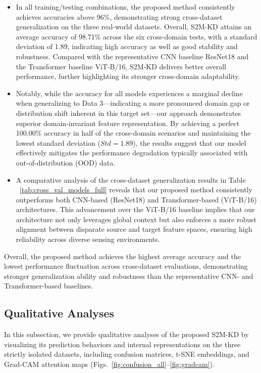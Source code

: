 \documentclass[review]{elsarticle}
\begin{document}
\begin{itemize}
\item In all training/testing combinations, the proposed method consistently achieves accuracies above 96\%, demonstrating strong cross-dataset generalization on the three real-world datasets. Overall, S2M-KD attains an average accuracy of 98.71\% across the six cross-domain tests, with a standard deviation of 1.89, indicating high accuracy as well as good stability and robustness. Compared with the representative CNN baseline ResNet18 and the Transformer baseline ViT-B/16, S2M-KD delivers better overall performance, further highlighting its stronger cross-domain adaptability.

 \item Notably, while the accuracy for all models experiences a marginal decline when generalizing to Data 3—indicating a more pronounced domain gap or distribution shift inherent in this target set—our approach demonstrates superior domain-invariant feature representation. By achieving a perfect 100.00\% accuracy in half of the cross-domain scenarios and maintaining the lowest standard deviation ($Std= 1.89$), the results suggest that our model effectively mitigates the performance degradation typically associated with out-of-distribution (OOD) data.
 \item A comparative analysis of the cross-dataset generalization results in Table ~\ref{tab:cross_val_models_full} reveals that our proposed method consistently outperforms both CNN-based (ResNet18) and Transformer-based (ViT-B/16) architectures. This advancement over the ViT-B/16 baseline implies that our architecture not only leverages global context but also enforces a more robust alignment between disparate source and target feature spaces, ensuring high reliability across diverse sensing environments.
\end{itemize}
Overall, the proposed method achieves the highest average accuracy and the lowest performance fluctuation across cross-dataset evaluations, demonstrating stronger generalization ability and robustness than the representative CNN- and Transformer-based baselines.



\subsection{Qualitative Analyses} \label{subsec:quaana}
In this subsection, we provide qualitative analyses of the proposed S2M-KD by visualizing its prediction behaviors and internal representations on the three strictly isolated datasets, including confusion matrices, t-SNE embeddings, and Grad-CAM attention maps (Figs.~\ref{fig:confusion_all}--\ref{fig:gradcam}).
\end{document}
